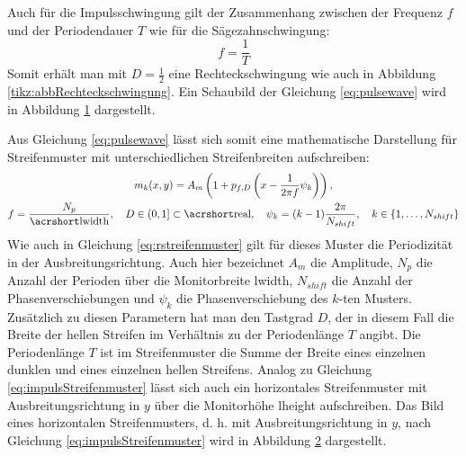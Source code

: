 Auch für die Impulsschwingung gilt der Zusammenhang zwischen der Frequenz $f$ und der Periodendauer $T$ wie für die Sä\-ge\-zahn\-schwin\-gung:
%
\begin{equation*}
	f = \dfrac{1}{T}
\end{equation*}
%
Somit erhält man mit $D = \tfrac{1}{2}$ eine Rechteckschwingung wie auch in Abbildung \ref{tikz:abbRechteckschwingung}.
Ein Schaubild der Gleichung \ref{eq:pulsewave} wird in Abbildung \ref{tikz:abbNormalPulsewave} dargestellt.
%
{
	\begin{figure}[H]
		\centering
		
		\label{tikz:abbNormalPulsewave}
	\end{figure}
}
%
\noindent
Aus Gleichung \ref{eq:pulsewave} lässt sich somit eine mathematische Darstellung für Streifenmuster mit unterschiedlichen Streifenbreiten aufschreiben:
%
\begin{equation} \label{eq:impulsStreifenmuster}
	\begin{gathered}
		m_k(x,y) = A_m \left( 1 + p_{f,D}\left( x - \dfrac{1}{2 \pi f} \psi_k \right) \right),
		\\
		f = \dfrac{N_p}{\acrshortmath{lwidth}},
		\quad
		D \in \left(0,1\right] \subset \acrshortmath{real},
		\quad
		\psi_k = (k - 1)\dfrac{2\pi}{N_{shift}},
		\quad
		k \in \lbrace 1,\ldots,N_{shift}\rbrace
	\end{gathered}
\end{equation}
%
Wie auch in Gleichung \ref{eq:rstreifenmuster} gilt für dieses Muster die Periodizität in der Ausbreitungsrichtung.
Auch hier bezeichnet $A_m$ die Amplitude, $N_p$ die Anzahl der Perioden über die Monitorbreite \acrshort{lwidth}, $N_{shift}$ die Anzahl der Phasenverschiebungen und $\psi_k$ die Phasenverschiebung des $k$-ten Musters.
Zusätzlich zu diesen Parametern hat man den Tastgrad $D$, der in diesem Fall die Breite der hellen Streifen im Verhältnis zu der Periodenlänge $T$ angibt.
Die Periodenlänge $T$ ist im Streifenmuster die Summe der Breite eines einzelnen dunklen und eines einzelnen hellen Streifens.
Analog zu Gleichung \ref{eq:impulsStreifenmuster} lässt sich auch ein horizontales Streifenmuster mit Ausbreitungsrichtung in $y$ über die Monitorhöhe \acrshort{lheight} aufschreiben.
Das Bild eines horizontalen Streifenmusters, d. h. mit Ausbreitungsrichtung in $y$, nach Gleichung \ref{eq:impulsStreifenmuster} wird in Abbildung \ref{tikz:abbImpulsStreifenmuster} dargestellt.
%
{
	\begin{figure}[H]
		\centering
		
		\label{tikz:abbImpulsStreifenmuster}
	\end{figure}
}